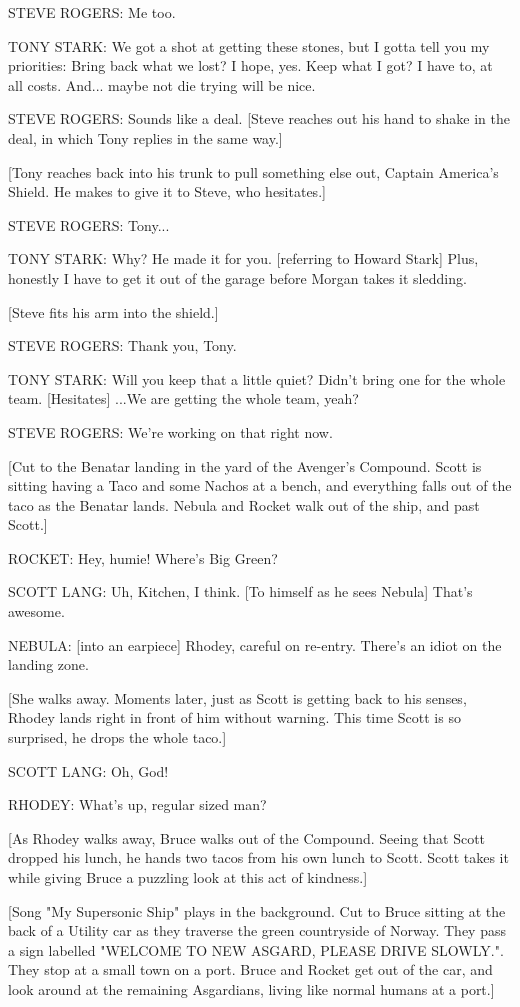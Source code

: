 STEVE ROGERS: Me too.

TONY STARK: We got a shot at getting these stones, but I gotta tell you my priorities: Bring back what we lost? I hope, yes. Keep what I got? I have to, at all costs. And... maybe not die trying will be nice.

STEVE ROGERS: Sounds like a deal. [Steve reaches out his hand to shake in the deal, in which Tony replies in the same way.]

[Tony reaches back into his trunk to pull something else out, Captain America's Shield. He makes to give it to Steve, who hesitates.]

STEVE ROGERS: Tony...

TONY STARK: Why? He made it for you. [referring to Howard Stark] Plus, honestly I have to get it out of the garage before Morgan takes it sledding.

[Steve fits his arm into the shield.]

STEVE ROGERS: Thank you, Tony.

TONY STARK: Will you keep that a little quiet? Didn't bring one for the whole team. [Hesitates] ...We are getting the whole team, yeah?

STEVE ROGERS: We're working on that right now.

[Cut to the Benatar landing in the yard of the Avenger's Compound. Scott is sitting having a Taco and some Nachos at a bench, and everything falls out of the taco as the Benatar lands. Nebula and Rocket walk out of the ship, and past Scott.]

ROCKET: Hey, humie! Where's Big Green?

SCOTT LANG: Uh, Kitchen, I think. [To himself as he sees Nebula] That's awesome.

NEBULA: [into an earpiece] Rhodey, careful on re-entry. There's an idiot on the landing zone.

[She walks away. Moments later, just as Scott is getting back to his senses, Rhodey lands right in front of him without warning. This time Scott is so surprised, he drops the whole taco.]

SCOTT LANG: Oh, God!

RHODEY: What's up, regular sized man?

[As Rhodey walks away, Bruce walks out of the Compound. Seeing that Scott dropped his lunch, he hands two tacos from his own lunch to Scott. Scott takes it while giving Bruce a puzzling look at this act of kindness.]

[Song "My Supersonic Ship" plays in the background. Cut to Bruce sitting at the back of a Utility car as they traverse the green countryside of Norway. They pass a sign labelled "WELCOME TO NEW ASGARD, PLEASE DRIVE SLOWLY.". They stop at a small town on a port. Bruce and Rocket get out of the car, and look around at the remaining Asgardians, living like normal humans at a port.]

